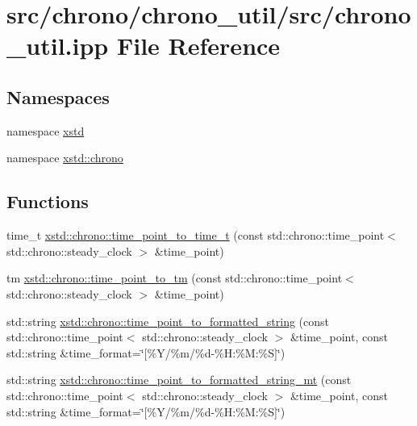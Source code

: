 \hypertarget{chrono__util_8ipp}{\section{src/chrono/chrono\-\_\-util/src/chrono\-\_\-util.ipp File Reference}
\label{chrono__util_8ipp}
}
\subsection*{Namespaces}
\begin{DoxyCompactItemize}
\item 
namespace \hyperlink{namespacexstd}{xstd}
\item 
namespace \hyperlink{namespacexstd_1_1chrono}{xstd\-::chrono}
\end{DoxyCompactItemize}
\subsection*{Functions}
\begin{DoxyCompactItemize}
\item 
time\-\_\-t \hyperlink{namespacexstd_1_1chrono_af3f86d799ca227d2bf0ac8ff5a08df3b}{xstd\-::chrono\-::time\-\_\-point\-\_\-to\-\_\-time\-\_\-t} (const std\-::chrono\-::time\-\_\-point$<$ std\-::chrono\-::steady\-\_\-clock $>$ \&time\-\_\-point)
\item 
tm \hyperlink{namespacexstd_1_1chrono_a1f31cb15f2e74489fc0f98fa38758067}{xstd\-::chrono\-::time\-\_\-point\-\_\-to\-\_\-tm} (const std\-::chrono\-::time\-\_\-point$<$ std\-::chrono\-::steady\-\_\-clock $>$ \&time\-\_\-point)
\item 
std\-::string \hyperlink{namespacexstd_1_1chrono_a5fd95ee0963d407c39528b3f48790842}{xstd\-::chrono\-::time\-\_\-point\-\_\-to\-\_\-formatted\-\_\-string} (const std\-::chrono\-::time\-\_\-point$<$ std\-::chrono\-::steady\-\_\-clock $>$ \&time\-\_\-point, const std\-::string \&time\-\_\-format=\char`\"{}\mbox{[}\%Y/\%m/\%d-\/\%H\-:\%M\-:\%S\mbox{]}\char`\"{})
\item 
std\-::string \hyperlink{namespacexstd_1_1chrono_a07cd40fda33f294f91510fe6895ce6c7}{xstd\-::chrono\-::time\-\_\-point\-\_\-to\-\_\-formatted\-\_\-string\-\_\-mt} (const std\-::chrono\-::time\-\_\-point$<$ std\-::chrono\-::steady\-\_\-clock $>$ \&time\-\_\-point, const std\-::string \&time\-\_\-format=\char`\"{}\mbox{[}\%Y/\%m/\%d-\/\%H\-:\%M\-:\%S\mbox{]}\char`\"{})
\end{DoxyCompactItemize}
